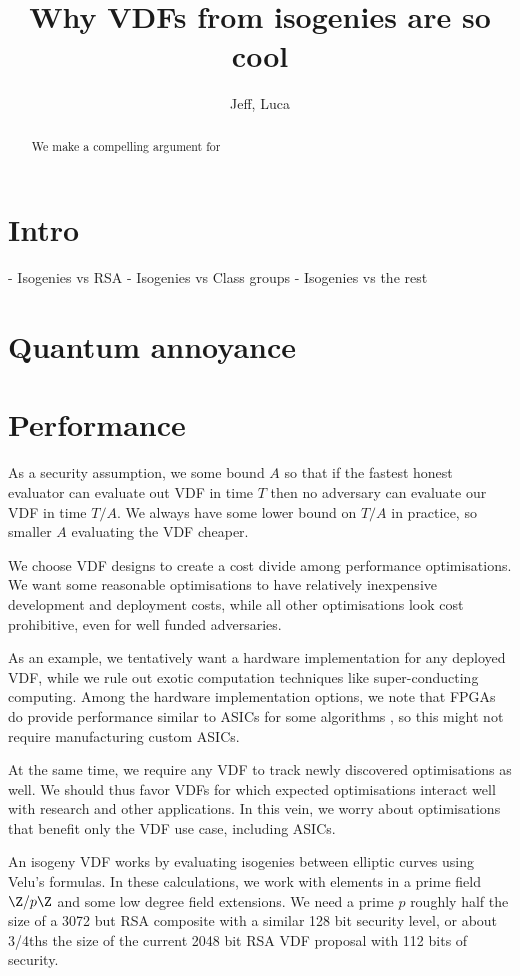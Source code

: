 \documentclass{article}
\title{Why VDFs from isogenies are so cool}
\author{Jeff, Luca}
\date{}
\begin{document}
\maketitle

\begin{abstract}
We make a compelling argument for 
\end{abstract}

\section{Intro}


- Isogenies vs RSA
- Isogenies vs Class groups
- Isogenies vs the rest


\section{Quantum annoyance}



\section{Performance}

As a security assumption, we some bound $A$ so that if the fastest
honest evaluator can evaluate out VDF in time $T$ then no adversary
can evaluate our VDF in time $T/A$.  We always have some lower
bound on $T/A$ in practice, so smaller $A$ evaluating the VDF cheaper.

We choose VDF designs to create a cost divide among performance
optimisations.  We want some reasonable optimisations to have
relatively inexpensive development and deployment costs, while
all other optimisations look cost prohibitive, even for well funded
adversaries.

As an example, we tentatively want a hardware implementation for
any deployed VDF, while we rule out exotic computation techniques
like super-conducting computing.  Among the hardware implementation
options, we note that FPGAs do provide performance similar to ASICs
for some algorithms \cite{????},
so this might not require manufacturing custom ASICs.

At the same time, we require any VDF to track newly discovered
optimisations as well.  We should thus favor VDFs for which expected
optimisations interact well with research and other applications.
In this vein, we worry about optimisations that benefit only the VDF
use case, including ASICs.

An isogeny VDF works by evaluating isogenies between elliptic curves
using Velu's formulas.  In these calculations, we work with elements
in a prime field $\Z/p\Z$ and some low degree field extensions. 
We need a prime $p$ roughly half the size of a 3072 but RSA composite
with a similar 128 bit security level, or about 3/4ths the size of the
current 2048 bit RSA VDF proposal with 112 bits of security.
\end{document}
